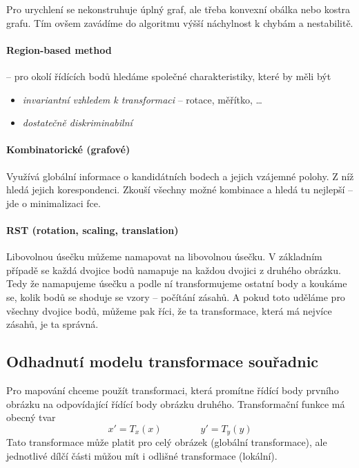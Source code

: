 Pro urychlení se nekonstruhuje úplný graf, ale třeba konvexní obálka nebo kostra grafu. Tím ovšem zavádíme do algoritmu výšší 
náchylnost k chybám a nestabilitě.


\paragraph{Region-based method} -- pro okolí řídících bodů hledáme společné charakteristiky, které by měli být
 \begin{itemize}
 \item \emph{invariantní vzhledem k transformaci} -- rotace, měřítko, \dots
 \item \emph{dostatečně diskriminabilní} \end{itemize}


\paragraph{Kombinatorické (grafové)} Využívá globální informace o kandidátních bodech a jejich vzájemné polohy. Z níž hledá jejich korespondenci. Zkouší všechny možné kombinace a hledá tu nejlepší – jde o minimalizaci fce.

\paragraph{RST (rotation, scaling, translation)}
Libovolnou úsečku můžeme namapovat na libovolnou úsečku. V základním případě se každá dvojice bodů namapuje na každou dvojici z druhého obrázku. Tedy že namapujeme úsečku a podle ní transformujeme ostatní body a koukáme se, kolik bodů se shoduje se vzory – počítání zásahů. A pokud toto uděláme pro všechny dvojice bodů, můžeme pak říci, že ta transformace, která má nejvíce zásahů, je ta správná.

\subsection{Odhadnutí modelu transformace souřadnic}
Pro mapování chceme použít transformaci, která promítne řídící body prvního obrázku na odpovídající řídící body obrázku druhého. Transformační funkce má obecný tvar
\begin{equation}
x' = T_x (x) \qquad \qquad
y' = T_y (y)
\end{equation}
Tato transformace může platit pro celý obrázek (globální transformace), ale jednotlivé dílčí části můžou mít i odlišné transformace (lokální).

